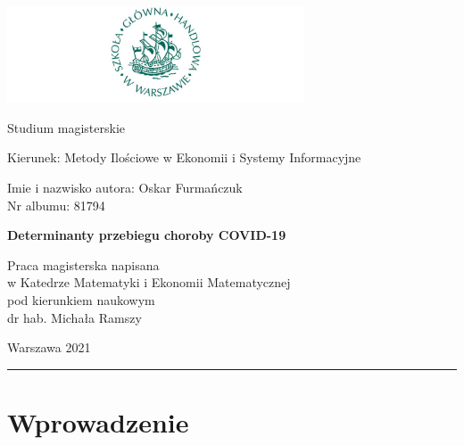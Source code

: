 \documentclass[polish, twoside, 12pt, a4paper]{article}
\theoremstyle{definition}
\theoremstyle{plain}
\theoremstyle{remark}
\begin{document}
\begin{titlepage}
\centering

\includegraphics[width=0.66\textwidth]{logo.JPG}

\vspace*{0.5cm}
Studium magisterskie\\
\begin{flushleft}
Kierunek: Metody Ilościowe w Ekonomii i Systemy Informacyjne\\
\end{flushleft}

\vspace*{.5cm}
\rule{0cm}{1cm}\hfill
\begin{minipage}{9cm}
Imie i nazwisko autora: Oskar Furmańczuk\\
Nr albumu: 81794
\end{minipage}

\vspace*{1cm}
\begin{minipage}{12cm}
\centering
\Large
\textbf{Determinanty przebiegu choroby COVID-19}
\end{minipage}

\vspace*{2cm}
\rule{0cm}{1cm}\hfill
\begin{minipage}{9cm}
Praca magisterska napisana\\
w Katedrze Matematyki i Ekonomii Matematycznej\\
pod kierunkiem naukowym\\
dr hab. Michała Ramszy
\end{minipage}

\vfill
Warszawa 2021
\end{titlepage}

\rule{1ex}{0ex}\clearpage

\graphicspath{ {./images/} }
\cleardoublepage
\tableofcontents

\cleardoublepage
\section{Wprowadzenie}
\end{document}

